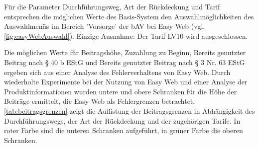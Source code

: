 Für die Parameter Durchführungsweg, Art der Rückdeckung und Tarif entsprechen die möglichen Werte des Basis-System den Auswahlmöglichkeiten des Auswahlmenüs im Bereich 'Vorsorge' der bAV bei Easy Web (vgl. \autoref{fig:easyWebAuswahl}). Einzige Ausnahme: Der Tarif LV10 wird ausgeschlossen.

Die möglichen Werte für Beitragshöhe, Zuzahlung zu Beginn, Bereits genutzter Beitrag nach § 40 b EStG und Bereits genutzter Beitrag nach § 3 Nr. 63 EStG ergeben sich aus einer Analyse des Fehlerverhaltens von Easy Web. Durch wiederholte Experimente bei der Nutzung von Easy Web und einer Analyse der Produktinformationen \cite{alh_produkte} wurden untere und obere Schranken für die Höhe der Beiträge ermittelt, die Easy Web als Fehlergrenzen betrachtet. \autoref{tab:beitragsgrenzen} zeigt die Auflistung der Beitragsgrenzen in Abhängigkeit des Durchführungswegs, der Art der Rückdeckung und der zugehörigen Tarife. In roter Farbe sind die unteren Schranken aufgeführt, in grüner Farbe die oberen Schranken.







\renewcommand{\arraystretch}{2.5}

